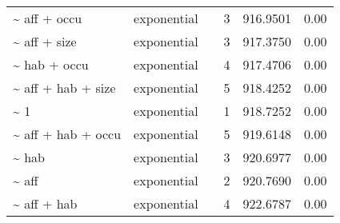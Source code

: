 \begin{table}[ht]
\begin{tabular}{llrrrr}
  \~{} aff + occu & exponential &  & 3 & 916.9501 & 0.00 \\ 
  \~{} aff + size & exponential &  & 3 & 917.3750 & 0.00 \\ 
  \~{} hab + occu & exponential &  & 4 & 917.4706 & 0.00 \\ 
  \~{} aff + hab + size & exponential &  & 5 & 918.4252 & 0.00 \\ 
  \~{} 1 & exponential &  & 1 & 918.7252 & 0.00 \\ 
  \~{} aff + hab + occu & exponential &  & 5 & 919.6148 & 0.00 \\ 
  \~{} hab & exponential &  & 3 & 920.6977 & 0.00 \\ 
  \~{} aff & exponential &  & 2 & 920.7690 & 0.00 \\ 
  \~{} aff + hab & exponential &  & 4 & 922.6787 & 0.00 \\ 
  \end{tabular}
\label{tab:mod}
\end{table}
